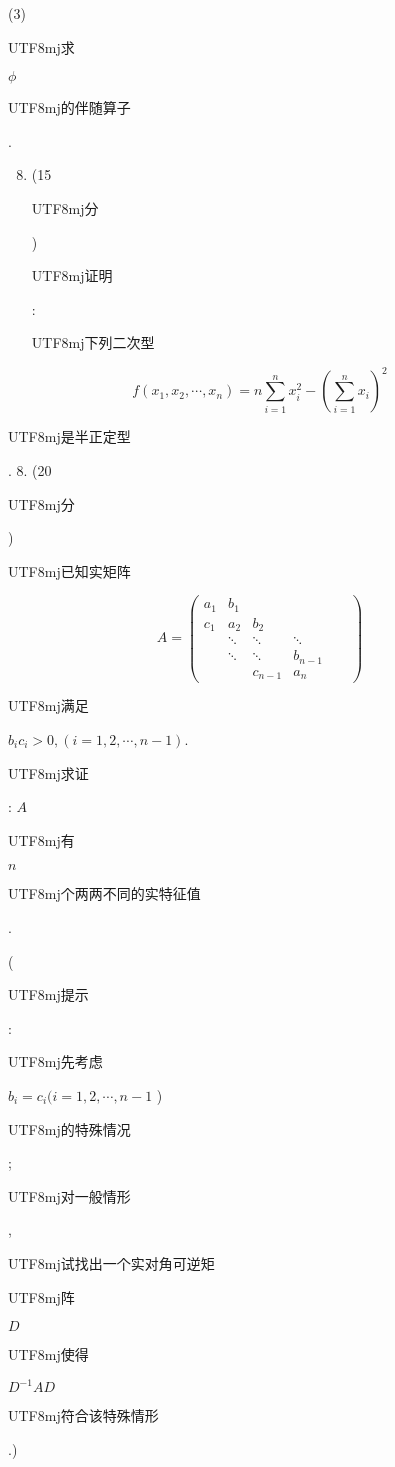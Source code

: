 \documentclass[10pt]{article}
\begin{document}
(3) \begin{CJK}{UTF8}{mj}求\end{CJK} $\phi$ \begin{CJK}{UTF8}{mj}的伴随算子\end{CJK}.

\begin{enumerate}
  \setcounter{enumi}{7}
  \item (15 \begin{CJK}{UTF8}{mj}分\end{CJK}) \begin{CJK}{UTF8}{mj}证明\end{CJK}: \begin{CJK}{UTF8}{mj}下列二次型\end{CJK}
\end{enumerate}
$$
f\left(x_{1}, x_{2}, \cdots, x_{n}\right)=n \sum_{i=1}^{n} x_{i}^{2}-\left(\sum_{i=1}^{n} x_{i}\right)^{2}
$$
\begin{CJK}{UTF8}{mj}是半正定型\end{CJK}. 8. (20 \begin{CJK}{UTF8}{mj}分\end{CJK}) \begin{CJK}{UTF8}{mj}已知实矩阵\end{CJK}
$$
A=\left(\begin{array}{cccccc}
a_{1} & b_{1} & & & & \\
c_{1} & a_{2} & b_{2} & & \\
& \ddots & \ddots & \ddots & \\
& \ddots & \ddots & b_{n-1} \\
& & c_{n-1} & a_{n}
\end{array}\right)
$$
\begin{CJK}{UTF8}{mj}满足\end{CJK} $b_{i} c_{i}>0,(i=1,2, \cdots, n-1)$. \begin{CJK}{UTF8}{mj}求证\end{CJK}: $A$ \begin{CJK}{UTF8}{mj}有\end{CJK} $n$ \begin{CJK}{UTF8}{mj}个两两不同的实特征值\end{CJK}.

(\begin{CJK}{UTF8}{mj}提示\end{CJK}: \begin{CJK}{UTF8}{mj}先考虑\end{CJK} $b_{i}=c_{i}(i=1,2, \cdots, n-1$ ) \begin{CJK}{UTF8}{mj}的特殊情况\end{CJK}; \begin{CJK}{UTF8}{mj}对一般情形\end{CJK}, \begin{CJK}{UTF8}{mj}试找出一个实对角可逆矩\end{CJK} \begin{CJK}{UTF8}{mj}阵\end{CJK} $D$ \begin{CJK}{UTF8}{mj}使得\end{CJK} $D^{-1} A D$ \begin{CJK}{UTF8}{mj}符合该特殊情形\end{CJK}.)
\end{document}
